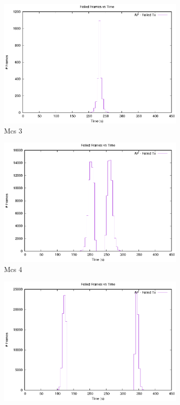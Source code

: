 \documentclass[12]{article}
\begin{document}
\begin{figure}[!htb]
\begin{subfigure}{.4\textwidth}
  \includegraphics[width=\linewidth]{"20Mhz_Long_1SS_0AU/CR_HtMcs3/FailedPackets"}
  \caption{Mcs 3}
  \label{fig:20_3_fpt}
\end{subfigure}%
\begin{subfigure}{.4\textwidth}
  \includegraphics[width=\linewidth]{"20Mhz_Long_1SS_0AU/CR_HtMcs4/FailedPackets"}
  \caption{Mcs 4}
  \label{fig:20_4_fpt}
\end{subfigure}%
\begin{subfigure}{.4\textwidth}
  \includegraphics[width=\linewidth]{"20Mhz_Long_1SS_0AU/CR_HtMcs7/FailedPackets"}

\end{subfigure}
\end{figure}
\end{document}
